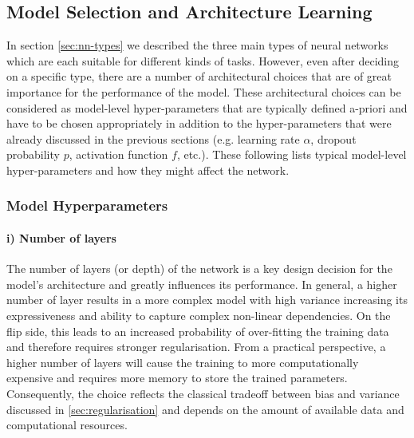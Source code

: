 




\subsection{Model Selection and Architecture Learning} %
In section \ref{sec:nn-types} we described the three main types of neural networks which are each suitable for different kinds of tasks. However, even after deciding on a specific type, there are a number of architectural choices that are of great importance for the performance of the model. These architectural choices can be considered as model-level hyper-parameters that are typically defined a-priori and have to be chosen appropriately in addition to the hyper-parameters that were already discussed in the previous sections (e.g. learning rate $\alpha$, dropout probability $p$, activation function $f$, etc.). These following lists typical model-level hyper-parameters and how they might affect the network. 

\subsubsection{Model Hyperparameters}
\paragraph{i) Number of layers} The number of layers (or depth) of the network is a key design decision for the model's architecture and greatly influences its performance. In general, a higher number of layer results in a more complex model with high variance increasing its expressiveness and ability to capture complex non-linear dependencies. On the flip side, %
this leads to an increased probability of over-fitting the training data and therefore requires stronger regularisation. From a practical perspective, a higher number of layers will cause the training to more computationally expensive and requires more memory to store the trained parameters. Consequently, the choice reflects the classical tradeoff between bias and variance discussed in \ref{sec:regularisation} and depends on the amount of available data and computational resources. 

